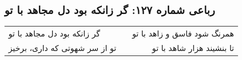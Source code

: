\begin{center}
\section*{رباعی شماره ۱۲۷: گر زانکه بود دل مجاهد با تو}
\label{sec:127}
\begin{longtable}{l p{0.5cm} r}
گر زانکه بود دل مجاهد با تو
&&
همرنگ شود فاسق و زاهد با تو
\\
تو از سر شهوتی که داری، برخیز
&&
تا بنشیند هزار شاهد با تو
\\
\end{longtable}
\end{center}
